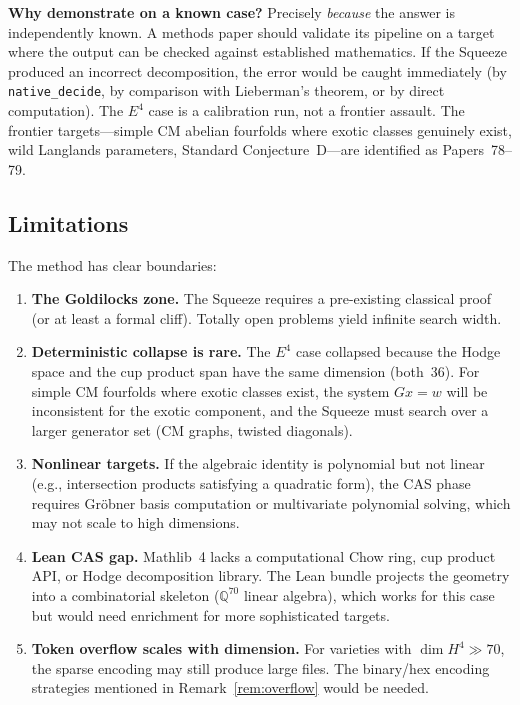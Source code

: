 \documentclass[11pt]{article}
\theoremstyle{plain}
\theoremstyle{definition}
\theoremstyle{remark}
\newcommand{\Q}{\mathbb{Q}}
\begin{document}
\medskip\noindent
\textbf{Why demonstrate on a known case?}
Precisely \emph{because} the answer is independently known.
A methods paper should validate its pipeline on a target where
the output can be checked against established mathematics.
If the Squeeze produced an incorrect decomposition, the error
would be caught immediately (by \texttt{native\_decide}, by
comparison with Lieberman's theorem, or by direct computation).
The $E^4$ case is a calibration run, not a frontier assault.
The frontier targets---simple CM abelian fourfolds where exotic
classes genuinely exist, wild Langlands parameters, Standard
Conjecture~D---are identified as Papers~78--79.

\subsection{Limitations}\label{sec:limits}

The method has clear boundaries:

\begin{enumerate}[nosep]
\item \textbf{The Goldilocks zone.}  The Squeeze requires a
  pre-existing classical proof (or at least a formal cliff).
  Totally open problems yield infinite search width.
\item \textbf{Deterministic collapse is rare.}  The $E^4$ case
  collapsed because the Hodge space and the cup product span have
  the same dimension (both~36).  For simple CM fourfolds where
  exotic classes exist, the system $Gx = w$ will be inconsistent
  for the exotic component, and the Squeeze must search over a
  larger generator set (CM graphs, twisted diagonals).
\item \textbf{Nonlinear targets.}  If the algebraic identity
  is polynomial but not linear (e.g., intersection products
  satisfying a quadratic form), the CAS phase requires
  Gr\"obner basis computation or multivariate polynomial solving,
  which may not scale to high dimensions.
\item \textbf{Lean CAS gap.}  Mathlib~4 lacks a computational
  Chow ring, cup product API, or Hodge decomposition library.
  The Lean bundle projects the geometry into a combinatorial
  skeleton ($\Q^{70}$ linear algebra), which works for this case
  but would need enrichment for more sophisticated targets.
\item \textbf{Token overflow scales with dimension.}  For
  varieties with $\dim H^4 \gg 70$, the sparse encoding may
  still produce large files.  The binary/hex encoding strategies
  mentioned in Remark~\ref{rem:overflow} would be needed.
\end{enumerate}
\end{document}
